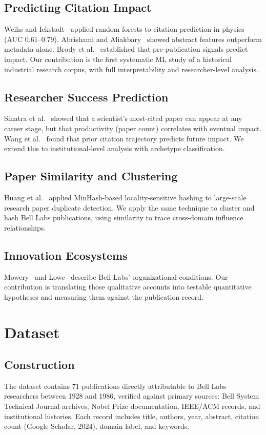 \documentclass[journal]{IEEEtran}
\begin{document}
\subsection{Predicting Citation Impact}
Weihs and Ickstadt~\cite{Weihs2018} applied random forests to citation
prediction in physics (AUC 0.61--0.79). Abrishami and
Aliakbary~\cite{Abrishami2019} showed abstract features outperform metadata
alone. Brody et al.~\cite{Brody2006} established that pre-publication signals
predict impact. Our contribution is the first systematic ML study of a
historical industrial research corpus, with full interpretability and
researcher-level analysis.

\subsection{Researcher Success Prediction}
Sinatra et al.~\cite{Sinatra2016} showed that a scientist's most-cited paper
can appear at any career stage, but that productivity (paper count) correlates
with eventual impact. Wang et al.~\cite{Wang2013} found that prior citation
trajectory predicts future impact. We extend this to institutional-level
analysis with archetype classification.

\subsection{Paper Similarity and Clustering}
Huang et al.~\cite{Huang2015} applied MinHash-based locality-sensitive hashing
to large-scale research paper duplicate detection. We apply the same technique
to cluster and hash Bell Labs publications, using similarity to trace
cross-domain influence relationships.

\subsection{Innovation Ecosystems}
Mowery~\cite{Mowery2009} and Lowe~\cite{Lowe2024} describe Bell Labs'
organizational conditions. Our contribution is translating those qualitative
accounts into testable quantitative hypotheses and measuring them against
the publication record.


\section{Dataset}
\label{sec:data}

\subsection{Construction}
The dataset contains 71 publications directly attributable to Bell Labs
researchers between 1928 and 1986, verified against primary sources: Bell
System Technical Journal archives, Nobel Prize documentation, IEEE/ACM
records, and institutional histories. Each record includes title, authors,
year, abstract, citation count (Google Scholar, 2024), domain label, and keywords.
\end{document}
